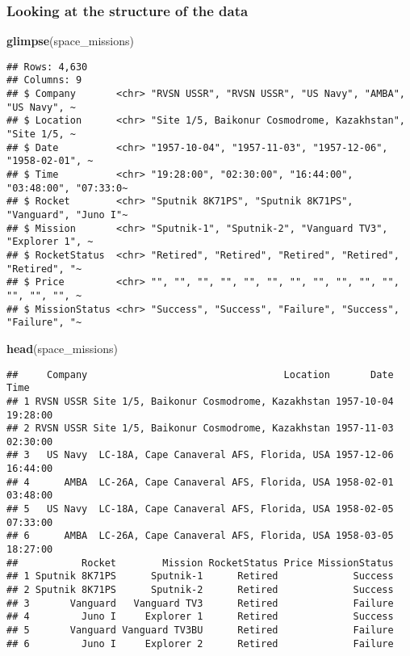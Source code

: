 \documentclass[
]{article}
\newenvironment{Shaded}{\begin{snugshade}}{\end{snugshade}}
\newcommand{\FunctionTok}[1]{\textcolor[rgb]{0.13,0.29,0.53}{\textbf{#1}}}
\newcommand{\NormalTok}[1]{#1}
\begin{document}
\hypertarget{looking-at-the-structure-of-the-data}{%
\subsubsection{Looking at the structure of the
data}\label{looking-at-the-structure-of-the-data}}

\begin{Shaded}
\begin{Highlighting}[]
\FunctionTok{glimpse}\NormalTok{(space\_missions)}
\end{Highlighting}
\end{Shaded}

\begin{verbatim}
## Rows: 4,630
## Columns: 9
## $ Company       <chr> "RVSN USSR", "RVSN USSR", "US Navy", "AMBA", "US Navy", ~
## $ Location      <chr> "Site 1/5, Baikonur Cosmodrome, Kazakhstan", "Site 1/5, ~
## $ Date          <chr> "1957-10-04", "1957-11-03", "1957-12-06", "1958-02-01", ~
## $ Time          <chr> "19:28:00", "02:30:00", "16:44:00", "03:48:00", "07:33:0~
## $ Rocket        <chr> "Sputnik 8K71PS", "Sputnik 8K71PS", "Vanguard", "Juno I"~
## $ Mission       <chr> "Sputnik-1", "Sputnik-2", "Vanguard TV3", "Explorer 1", ~
## $ RocketStatus  <chr> "Retired", "Retired", "Retired", "Retired", "Retired", "~
## $ Price         <chr> "", "", "", "", "", "", "", "", "", "", "", "", "", "", ~
## $ MissionStatus <chr> "Success", "Success", "Failure", "Success", "Failure", "~
\end{verbatim}

\begin{Shaded}
\begin{Highlighting}[]
\FunctionTok{head}\NormalTok{(space\_missions)}
\end{Highlighting}
\end{Shaded}

\begin{verbatim}
##     Company                                  Location       Date     Time
## 1 RVSN USSR Site 1/5, Baikonur Cosmodrome, Kazakhstan 1957-10-04 19:28:00
## 2 RVSN USSR Site 1/5, Baikonur Cosmodrome, Kazakhstan 1957-11-03 02:30:00
## 3   US Navy  LC-18A, Cape Canaveral AFS, Florida, USA 1957-12-06 16:44:00
## 4      AMBA  LC-26A, Cape Canaveral AFS, Florida, USA 1958-02-01 03:48:00
## 5   US Navy  LC-18A, Cape Canaveral AFS, Florida, USA 1958-02-05 07:33:00
## 6      AMBA  LC-26A, Cape Canaveral AFS, Florida, USA 1958-03-05 18:27:00
##           Rocket        Mission RocketStatus Price MissionStatus
## 1 Sputnik 8K71PS      Sputnik-1      Retired             Success
## 2 Sputnik 8K71PS      Sputnik-2      Retired             Success
## 3       Vanguard   Vanguard TV3      Retired             Failure
## 4         Juno I     Explorer 1      Retired             Success
## 5       Vanguard Vanguard TV3BU      Retired             Failure
## 6         Juno I     Explorer 2      Retired             Failure
\end{verbatim}
\end{document}
